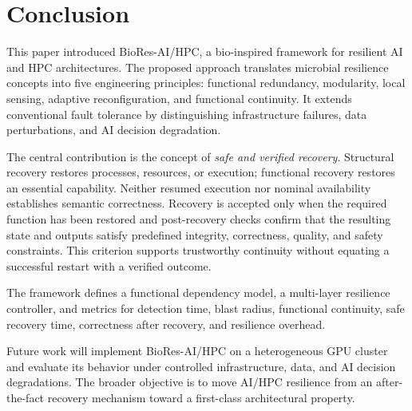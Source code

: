 \documentclass[conference]{IEEEtran}
\begin{document}
\section{Conclusion}

This paper introduced BioRes-AI/HPC, a bio-inspired framework for resilient AI and HPC architectures. The proposed approach translates microbial resilience concepts into five engineering principles: functional redundancy, modularity, local sensing, adaptive reconfiguration, and functional continuity. It extends conventional fault tolerance by distinguishing infrastructure failures, data perturbations, and AI decision degradation.

The central contribution is the concept of \emph{safe and verified recovery}. Structural recovery restores processes, resources, or execution; functional recovery restores an essential capability. Neither resumed execution nor nominal availability establishes semantic correctness. Recovery is accepted only when the required function has been restored and post-recovery checks confirm that the resulting state and outputs satisfy predefined integrity, correctness, quality, and safety constraints. This criterion supports trustworthy continuity without equating a successful restart with a verified outcome.

The framework defines a functional dependency model, a multi-layer resilience controller, and metrics for detection time, blast radius, functional continuity, safe recovery time, correctness after recovery, and resilience overhead.

Future work will implement BioRes-AI/HPC on a heterogeneous GPU cluster and evaluate its behavior under controlled infrastructure, data, and AI decision degradations. The broader objective is to move AI/HPC resilience from an after-the-fact recovery mechanism toward a first-class architectural property.
\end{document}
